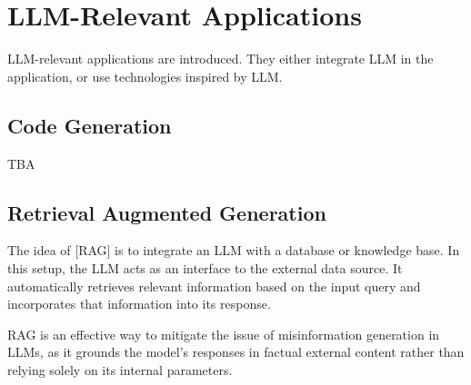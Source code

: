 \chapter{LLM-Relevant Applications}

LLM-relevant applications are introduced. They either integrate LLM in the application, or use technologies inspired by LLM.

\section{Code Generation}

TBA

\section{Retrieval Augmented Generation} \label{sec:retrievalaugmentedgeneration}

The idea of [RAG] is to integrate an LLM with a database or knowledge base. In this setup, the LLM acts as an interface to the external data source. It automatically retrieves relevant information based on the input query and incorporates that information into its response. 

RAG is an effective way to mitigate the issue of misinformation generation in LLMs, as it grounds the model's responses in factual external content rather than relying solely on its internal parameters.
